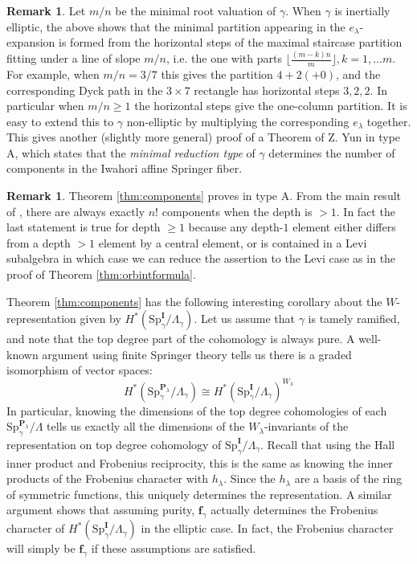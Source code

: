 \documentclass{amsart}
\numberwithin{equation}{section}
\theoremstyle{definition}
\newtheorem{remark}[lemma]{Remark}%
\def\Sp{{\mathrm{Sp}}}
\newcommand{\fgamma}{\mathbf{f}_{\gamma}}
\newcommand{\bP}{\mathbf{P}}
\newcommand{\bI}{\mathbf{I}}
\begin{document}
\begin{remark}
Let $m/n$ be the minimal root valuation of $\gamma$. When $\gamma$ is inertially elliptic, the above shows that the minimal partition appearing in the $e_\lambda$-expansion is formed from the horizontal steps of the maximal staircase partition fitting under a line of slope $m/n$, i.e. the one with parts $\lfloor \frac{(m-k)n}{m}\rfloor, k=1,\ldots m$. For example, when $m/n=3/7$ this gives the partition $4+2(+0)$, and the corresponding Dyck path in the $3\times 7$ rectangle has horizontal steps $3, 2, 2$. In particular when $m/n\geq 1$ the horizontal steps give the one-column partition.
It is easy to extend this to $\gamma$ non-elliptic by multiplying the corresponding $e_\lambda$ together.
This gives another (slightly more general) proof of a Theorem of Z. Yun in type A, which states that the {\em minimal reduction type} of $\gamma$ determines the number of components in the Iwahori affine Springer fiber.
\end{remark}
\begin{remark}
Theorem \ref{thm:components} proves \cite[Conjecture 8.7.]{Tsai20} in type A.
From the main result of \cite{Tsai20}, there are always exactly $n!$ components when the depth is $>1$. In fact the last statement is true for depth $\ge 1$ because any depth-$1$ element either differs from a depth $>1$ element by a central element, or is contained in a Levi subalgebra in which case we can reduce the assertion to the Levi case as in the proof of Theorem \ref{thm:orbintformula}.
\end{remark}
Theorem \ref{thm:components} has the following interesting corollary about the $W$-representation given by $H^*(\Sp_\gamma^{\bI}/\Lambda_\gamma)$. Let us assume that $\gamma$ is tamely ramified, and note that the top degree part of the cohomology is always pure. A well-known argument using finite Springer theory tells us there is a graded isomorphism of vector spaces:
$$H^*(\Sp_\gamma^{\bP_\lambda}/\Lambda_\gamma)\cong H^*(\Sp_\gamma^\bI/\Lambda_\gamma)^{W_\lambda}$$
In particular, knowing the dimensions of the top degree cohomologies of each $\Sp_\gamma^{\bP_\lambda}/\Lambda$ tells us exactly all the dimensions of the $W_\lambda$-invariants of the representation on top degree cohomology of $\Sp^\bI_\gamma/\Lambda_\gamma$. Recall that using the Hall inner product and Frobenius reciprocity, this is the same as knowing the inner products of the Frobenius character with $h_\lambda$. Since the $h_\lambda$ are a basis of the ring of symmetric functions, this uniquely determines the representation. A similar argument shows that assuming purity, $\fgamma$ actually determines the Frobenius character of $H^*(\Sp^\bI_\gamma/\Lambda_\gamma)$ in the elliptic case. In fact, the Frobenius character will simply be $\fgamma$ if these assumptions are satisfied.
\end{document}

